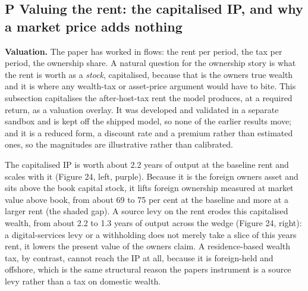\documentclass[12pt]{article}
\begin{document}
\hypertarget{p-valuing-the-rent-the-capitalised-ip-and-why-a-market-price-adds-nothing}{%
\subsection{P \textperiodcentered{} Valuing the rent: the capitalised IP, and why a market
price adds
nothing}\label{p-valuing-the-rent-the-capitalised-ip-and-why-a-market-price-adds-nothing}}

\textbf{Valuation.} The paper has worked in flows: the rent per period,
the tax per period, the ownership share. A natural question for the
ownership story is what the rent is worth as a \emph{stock},
capitalised, because that is the owner\textquotesingle s true wealth and
it is where any wealth-tax or asset-price argument would have to bite.
This subsection capitalises the after-host-tax rent the model produces,
at a required return, as a valuation overlay. It was developed and
validated in a separate sandbox and is kept off the shipped model, so
none of the earlier results move; and it is a reduced form, a discount
rate and a premium rather than estimated ones, so the magnitudes are
illustrative rather than calibrated.

The capitalised IP is worth about 2.2 years of output at the baseline
rent and scales with it (Figure 24, left, purple). Because it is the
foreign owner\textquotesingle s asset and sits above the book capital
stock, it lifts foreign ownership measured at market value above book,
from about 69 to 75 per cent at the baseline and more at a larger rent
(the shaded gap). A source levy on the rent erodes this capitalised
wealth, from about 2.2 to 1.3 years of output across the wedge (Figure
24, right): a digital-services levy or a withholding does not merely
take a slice of this year\textquotesingle s rent, it lowers the present
value of the owner\textquotesingle s claim. A residence-based wealth
tax, by contrast, cannot reach the IP at all, because it is foreign-held
and offshore, which is the same structural reason the
paper\textquotesingle s instrument is a source levy rather than a tax on
domestic wealth.
\end{document}
